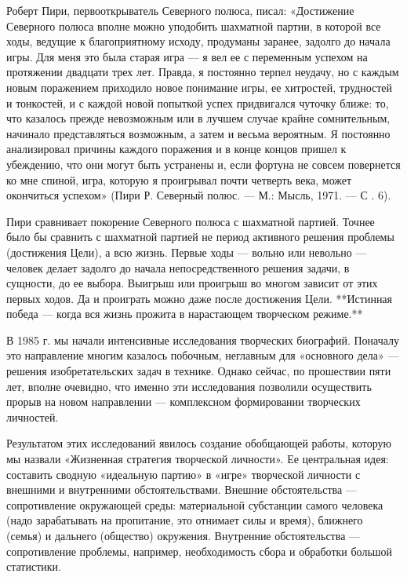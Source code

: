 Роберт  Пири, первооткрыватель  Северного  полюса, писал:  «Достижение
Северного полюса  вполне можно  уподобить шахматной партии,  в которой
все ходы, ведущие к  благоприятному исходу, продуманы заранее, задолго
до начала игры. Для меня это была  старая игра — я вел ее с переменным
успехом на  протяжении двадцати трех  лет. Правда, я  постоянно терпел
неудачу, но с каждым новым  поражением приходило новое понимание игры,
ее хитростей, трудностей и тонкостей,  и с каждой новой попыткой успех
придвигался чуточку ближе:  то, что казалось прежде  невозможным или в
лучшем случае крайне  сомнительным, начинало представляться возможным,
а затем и  весьма вероятным. Я постоянно  анализировал причины каждого
поражения и  в конце  концов пришел  к убеждению,  что они  могут быть
устранены и,  если фортуна не  совсем повернется ко мне  спиной, игра,
которую я  проигрывал почти  четверть века, может  окончиться успехом»
(Пири Р. Северный полюс. — М.: Мысль, 1971. — С . 6).

Пири сравнивает покорение Северного полюса с шахматной партией. Точнее
было  бы сравнить  с  шахматной партией  не  период активного  решения
проблемы  (достижения Цели),  а всю  жизнь. Первые  ходы —  вольно или
невольно — человек делает  задолго до начала непосредственного решения
задачи,  в сущности,  до ее  выбора.  Выигрыш или  проигрыш во  многом
зависит  от  этих  первых  ходов.  Да и  проиграть  можно  даже  после
достижения  Цели.  **Истинная  победа  — когда  вся  жизнь  прожита  в
нарастающем творческом режиме.**


В  1985 г.  мы начали  интенсивные исследования  творческих биографий.
Поначалу  это  направление  многим казалось  побочным,  неглавным  для
«основного дела»  — решения  изобретательских задач в  технике. Однако
сейчас,  по  прошествии пяти  лет,  вполне  очевидно, что  именно  эти
исследования  позволили  осуществить  прорыв на  новом  направлении  —
комплексном формировании творческих личностей.

Результатом  этих  исследований  явилось создание  обобщающей  работы,
которую  мы  назвали  «Жизненная стратегия  творческой  личности».  Ее
центральная  идея:  составить  сводную  «идеальную  партию»  в  «игре»
творческой  личности   с  внешними  и   внутренними  обстоятельствами.
Внешние обстоятельства —  сопротивление окружающей среды: материальной
субстанции  самого  человека  (надо зарабатывать  на  пропитание,  это
отнимает  силы  и  время),  ближнего  (семья)  и  дальнего  (общество)
окружения.   Внутренние  обстоятельства   —  сопротивление   проблемы,
например, необходимость сбора и обработки большой статистики.

